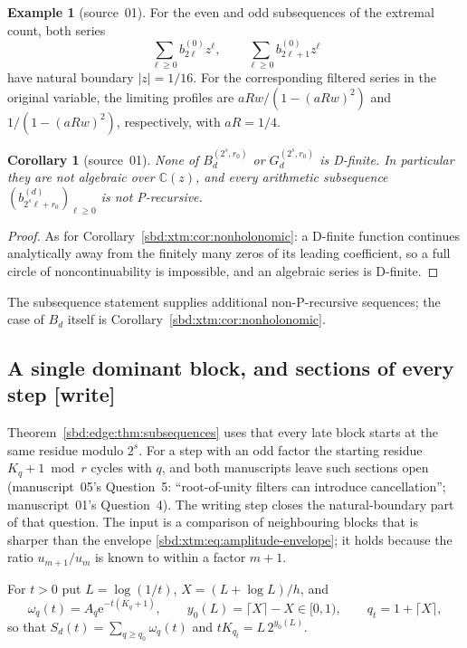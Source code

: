 \documentclass[11pt,a4paper]{article}
\newtheorem{corollary}[theorem]{Corollary}
\theoremstyle{definition}
\newtheorem{example}[theorem]{Example}
\newcommand{\C}{\mathbb C}
\newcommand{\e}{\mathrm e}
\begin{document}
\begin{example}[source~01]\label{sbd:edge:ex:parity}
For the even and odd subsequences of the extremal count, both series
\[
 \sum_{\ell\ge0}b_{2\ell}^{(0)}z^\ell,\qquad
 \sum_{\ell\ge0}b_{2\ell+1}^{(0)}z^\ell
\]
have natural boundary $|z|=1/16$. For the corresponding filtered series in
the original variable, the limiting profiles are $aRw/(1-(aRw)^2)$ and
$1/(1-(aRw)^2)$, respectively, with $aR=1/4$.
\end{example}

\begin{corollary}[source~01]\label{sbd:edge:cor:dfinite}
None of $B_d^{(2^s,r_0)}$ or $G_d^{(2^s,r_0)}$ is D-finite. In particular
they are not algebraic over $\C(z)$, and every arithmetic subsequence
$(b_{2^s\ell+r_0}^{(d)})_{\ell\ge0}$ is not P-recursive.
\end{corollary}
\begin{proof}
As for Corollary~\ref{sbd:xtm:cor:nonholonomic}: a D-finite function
continues analytically away from the finitely many zeros of its leading
coefficient, so a full circle of noncontinuability is impossible, and an
algebraic series is D-finite.
\end{proof}
The subsequence statement supplies additional non-P-recursive sequences;
the case of $B_d$ itself is Corollary~\ref{sbd:xtm:cor:nonholonomic}.

\subsection{A single dominant block, and sections of every step [write]}
\label{sbd:wr:sec:dominant}
Theorem~\ref{sbd:edge:thm:subsequences} uses that every late block starts at
the same residue modulo $2^s$. For a step with an odd factor the starting
residue $K_q+1\bmod r$ cycles with $q$, and both manuscripts leave such
sections open (manuscript~05's Question~5: ``root-of-unity filters can
introduce cancellation''; manuscript~01's Question~4). The writing step
closes the natural-boundary part of that question. The input is a
comparison of neighbouring blocks that is sharper than the envelope
\eqref{sbd:xtm:eq:amplitude-envelope}; it holds because the ratio
$u_{m+1}/u_m$ is known to within a factor $m+1$.

For $t>0$ put $L=\log(1/t)$, $X=(L+\log L)/h$, and
\begin{equation}\label{sbd:wr:eq:phase}
 \omega_q(t)=A_q\e^{-t(K_q+1)},\qquad
 y_0(L)=\lceil X\rceil-X\in[0,1),\qquad
 q_t=1+\lceil X\rceil,
\end{equation}
so that $S_d(t)=\sum_{q\ge q_0}\omega_q(t)$ and $tK_{q_t}=L\,2^{y_0(L)}$.
\end{document}
